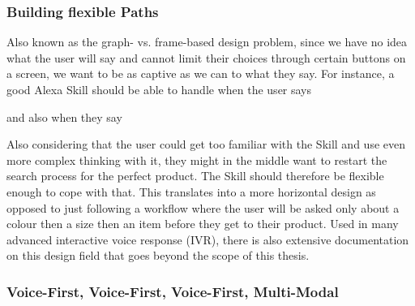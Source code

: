 \subsubsection*{Building flexible Paths}
Also known as the graph- vs. frame-based design problem, since we have no idea what the user will say and cannot limit their choices through certain buttons on a screen, we want to be as captive as we can to what they say. For instance, a good Alexa Skill should be able to handle when the user says



\noindent and also when they say 



Also considering that the user could get too familiar with the Skill and use even more complex thinking with it, they might in the middle want to restart the search process for the perfect product. The Skill should therefore be flexible enough to cope with that. This translates into a more horizontal design as opposed to just following a workflow where the user will be asked only about a colour then a size then an item before they get to their product. Used in many advanced interactive voice response (IVR), there is also extensive documentation on this design field that goes beyond the scope of this thesis.



\subsubsection*{Voice-First, Voice-First, Voice-First, Multi-Modal}

